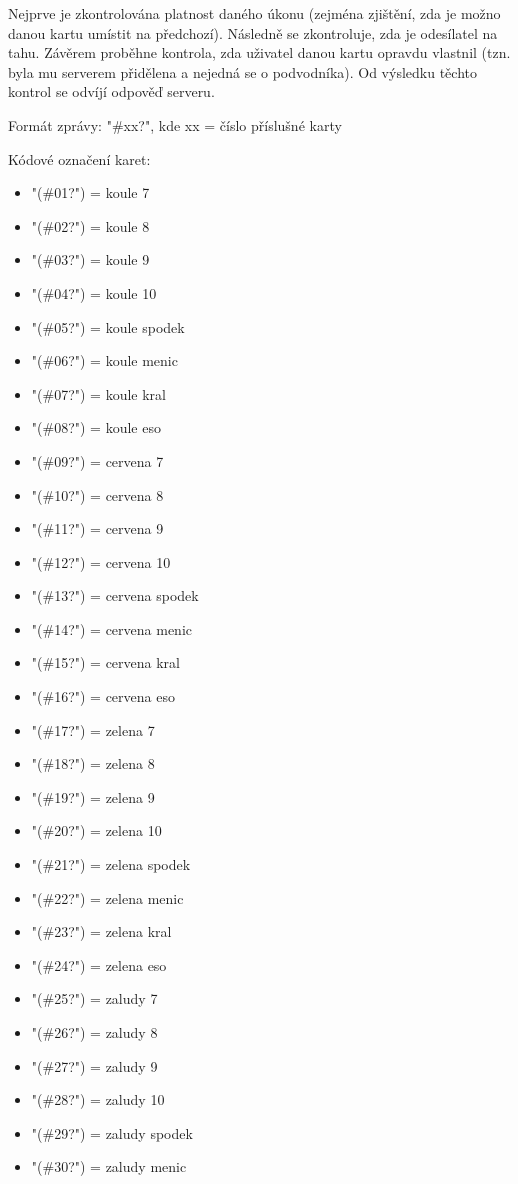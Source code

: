 \documentclass[12pt, a4paper, pdftex, czech, titlepage]{report}
\begin{document}
Nejprve je zkontrolována platnost daného úkonu (zejména zjištění, zda je možno
danou kartu umístit na předchozí). Následně se zkontroluje, zda je odesílatel na tahu.
Závěrem proběhne kontrola, zda uživatel danou kartu opravdu vlastnil (tzn. byla mu serverem přidělena a nejedná se o podvodníka).
Od výsledku těchto kontrol se odvíjí odpověď serveru.

Formát zprávy: "\#xx?", kde xx = číslo příslušné karty


Kódové označení karet:
\begin{itemize}
\item "(\#01?") = koule 7
\item "(\#02?") = koule 8
\item "(\#03?") = koule 9
\item "(\#04?") = koule 10
\item "(\#05?") = koule spodek
\item "(\#06?") = koule menic
\item "(\#07?") = koule kral
\item "(\#08?") = koule eso
\item "(\#09?") = cervena 7
\item "(\#10?") = cervena 8
\item "(\#11?") = cervena 9
\item "(\#12?") = cervena 10
\item "(\#13?") = cervena spodek
\item "(\#14?") = cervena menic
\item "(\#15?") = cervena kral
\item "(\#16?") = cervena eso
\item "(\#17?") = zelena 7
\item "(\#18?") = zelena 8
\item "(\#19?") = zelena 9
\item "(\#20?") = zelena 10
\item "(\#21?") = zelena spodek
\item "(\#22?") = zelena menic
\item "(\#23?") = zelena kral
\item "(\#24?") = zelena eso
\item "(\#25?") = zaludy 7
\item "(\#26?") = zaludy 8
\item "(\#27?") = zaludy 9
\item "(\#28?") = zaludy 10
\item "(\#29?") = zaludy spodek
\item "(\#30?") = zaludy menic

\end{itemize}
\end{document}
